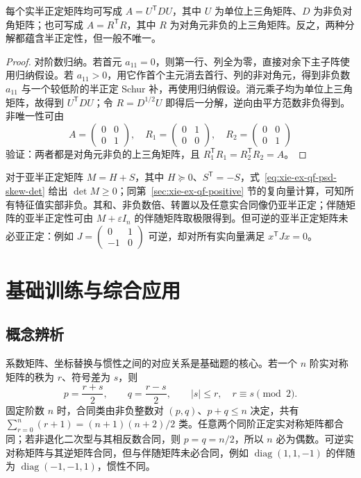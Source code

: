 \begin{proposition}
\label{prop:xie-ex-qf-semicholesky}
每个实半正定矩阵均可写成 $A=U^{\mathsf T}DU$，其中 $U$ 为单位上三角矩阵、$D$ 为非负对角矩阵；也可写成 $A=R^{\mathsf T}R$，其中 $R$ 为对角元非负的上三角矩阵。反之，两种分解都蕴含半正定性，但一般不唯一。
\end{proposition}
\begin{proof}
对阶数归纳。若首元 $a_{11}=0$，则第一行、列全为零，直接对余下主子阵使用归纳假设。若 $a_{11}>0$，用它作首个主元消去首行、列的非对角元，得到非负数 $a_{11}$ 与一个较低阶的半正定 Schur 补，再使用归纳假设。消元乘子均为单位上三角矩阵，故得到 $U^{\mathsf T}DU$；令 $R=D^{1/2}U$ 即得后一分解，逆向由平方范数非负得到。非唯一性可由
\[
 A=\begin{pmatrix}0&0\\0&1\end{pmatrix},\quad
 R_1=\begin{pmatrix}0&1\\0&0\end{pmatrix},\quad
 R_2=\begin{pmatrix}0&0\\0&1\end{pmatrix}
\]
验证：两者都是对角元非负的上三角矩阵，且 $R_1^{\mathsf T}R_1=R_2^{\mathsf T}R_2=A$。
\end{proof}

对于亚半正定矩阵 $M=H+S$，其中 $H\succeq0$、$S^{\mathsf T}=-S$，式~\eqref{eq:xie-ex-qf-psd-skew-det} 给出 $\det M\ge0$；同第~\ref{sec:xie-ex-qf-positive} 节的复向量计算，可知所有特征值实部非负。其和、非负数倍、转置以及任意实合同像仍亚半正定；伴随矩阵的亚半正定性可由 $M+\varepsilon I_n$ 的伴随矩阵取极限得到。但可逆的亚半正定矩阵未必亚正定：例如 $J=\begin{pmatrix}0&1\\-1&0\end{pmatrix}$ 可逆，却对所有实向量满足 $x^{\mathsf T}Jx=0$。

\section{基础训练与综合应用}
\label{sec:xie-ex-qf-training}

\subsection{概念辨析}

系数矩阵、坐标替换与惯性之间的对应关系是基础题的核心。若一个 $n$ 阶实对称矩阵的秩为 $r$、符号差为 $s$，则
\[
 p=\frac{r+s}{2},\qquad q=\frac{r-s}{2},\qquad
 |s|\le r,\quad r\equiv s\pmod2.
\]
固定阶数 $n$ 时，合同类由非负整数对 $(p,q)$、$p+q\le n$ 决定，共有 $\sum_{r=0}^n(r+1)=(n+1)(n+2)/2$ 类。任意两个同阶正定实对称矩阵都合同；若非退化二次型与其相反数合同，则 $p=q=n/2$，所以 $n$ 必为偶数。可逆实对称矩阵与其逆矩阵合同，但与伴随矩阵未必合同，例如 $\operatorname{diag}(1,1,-1)$ 的伴随为 $\operatorname{diag}(-1,-1,1)$，惯性不同。

